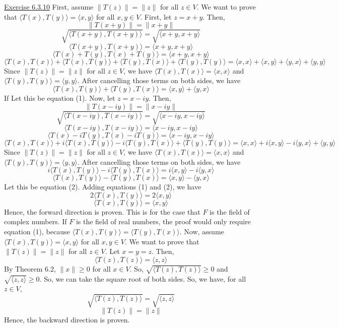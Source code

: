 \documentclass{exam}
\begin{document}
\underline{Exercise 6.3.10}
\newline
\newline
First, assume $\|T(z)\|=\|z\|$ for all $z\in V$. We want to prove that $\langle T(x),T(y)\rangle=\langle x,y\rangle$ for all $x,y\in V$. First, let $z=x+y$. Then,
\[\|T(x+y)\|=\|x+y\|\]
\[\sqrt{\langle T(x+y),T(x+y)\rangle}=\sqrt{\langle x+y,x+y\rangle}\]
\[\langle T(x+y),T(x+y)\rangle=\langle x+y,x+y\rangle\]
\[\langle T(x)+T(y),T(x)+T(y)\rangle=\langle x+y,x+y\rangle\]
\[\langle T(x),T(x)\rangle+\langle T(x),T(y)\rangle+\langle T(y),T(x)\rangle+\langle T(y),T(y)\rangle=\langle x,x\rangle+\langle x,y\rangle+\langle y,x\rangle+\langle y,y\rangle\]
Since $\|T(z)\|=\|z\|$ for all $z\in V$, we have $\langle T(x),T(x)\rangle=\langle x,x\rangle$ and $\langle T(y),T(y)\rangle=\langle y,y\rangle$. After cancelling those terms on both sides, we have
\[\langle T(x),T(y)\rangle+\langle T(y),T(x)\rangle=\langle x,y\rangle+\langle y,x\rangle\]
If Let this be equation (1). Now, let $z=x-iy$. Then,
\[\|T(x-iy)\|=\|x-iy\|\]
\[\sqrt{\langle T(x-iy),T(x-iy)\rangle}=\sqrt{\langle x-iy,x-iy\rangle}\]
\[\langle T(x-iy),T(x-iy)\rangle=\langle x-iy,x-iy\rangle\]
\[\langle T(x)-iT(y),T(x)-iT(y)\rangle=\langle x-iy,x-iy\rangle\]
\[\langle T(x),T(x)\rangle+i\langle T(x),T(y)\rangle-i\langle T(y),T(x)\rangle+\langle T(y),T(y)\rangle=\langle x,x\rangle+i\langle x,y\rangle-i\langle y,x\rangle+\langle y,y\rangle\]
Since $\|T(z)\|=\|z\|$ for all $z\in V$, we have $\langle T(x),T(x)\rangle=\langle x,x\rangle$ and $\langle T(y),T(y)\rangle=\langle y,y\rangle$. After cancelling those terms on both sides, we have
\[i\langle T(x),T(y)\rangle-i\langle T(y),T(x)\rangle=i\langle x,y\rangle-i\langle y,x\rangle\]
\[\langle T(x),T(y)\rangle-\langle T(y),T(x)\rangle=\langle x,y\rangle-\langle y,x\rangle\]
Let this be equation (2). Adding equations (1) and (2), we have
\[2\langle T(x),T(y)\rangle=2\langle x,y\rangle\]
\[\langle T(x),T(y)\rangle=\langle x,y\rangle\]
Hence, the forward direction is proven. This is for the case that $F$ is the field of complex numbers. If $F$ is the field of real numbers, the proof would only require equation (1), because $\langle T(x),T(y)\rangle=\langle T(y),T(x)\rangle$. Now, assume $\langle T(x),T(y)\rangle=\langle x,y\rangle$ for all $x,y\in V$. We want to prove that $\|T(z)\|=\|z\|$ for all $z\in V$. Let $x=y=z$. Then,
\[\langle T(z),T(z)\rangle=\langle z,z\rangle\]
By Theorem 6.2, $\|x\|\ge0$ for all $x\in V$. So, $\sqrt{\langle T(z),T(z)\rangle}\ge0$ and $\sqrt{\langle z,z\rangle}\ge0$. So, we can take the square root of both sides. So, we have, for all $z\in V$,
\[\sqrt{\langle T(z),T(z)\rangle}=\sqrt{\langle z,z\rangle}\]
\[\|T(z)\|=\|z\|\]
Hence, the backward direction is proven.
\newline
\end{document}
